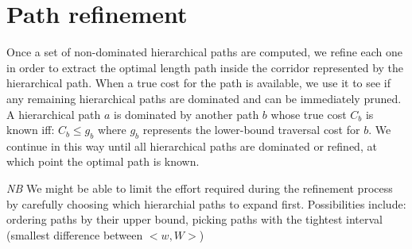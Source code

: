\section{Path refinement}
\label{ia-sec:refinement}
Once a set of non-dominated hierarchical paths are computed, we refine each one in order to extract the optimal length path inside the corridor represented by the hierarchical path.
When a true cost for the path is available, we use it to see if any remaining hierarchical paths are dominated and can be immediately pruned.
A hierarchical path $a$ is dominated by another path $b$ whose true cost $C_{b}$ is known iff: $C_{b} \leq g_{b}$ where $g_{b}$ represents the lower-bound traversal cost for $b$.
We continue in this way until all hierarchical paths are dominated or refined, at which point the optimal path is known.

\emph{NB} We might be able to limit the effort required during the refinement process by carefully choosing which hierarchial paths to expand first. Possibilities include: ordering paths by their upper bound, picking paths with the tightest interval (smallest difference between $<w, W>$)


